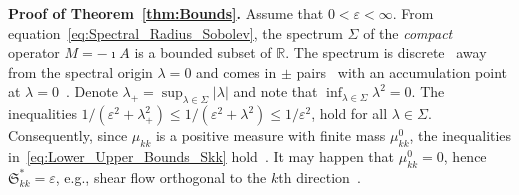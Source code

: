 \documentclass[english,12pt,jmp,graphicx]{revtex4-1}
\newcommand{\thmref}[1]{Theorem~\ref{#1}}
\newcommand{\Sg}{\mathfrak{S}}
\newcommand{\Ag}{\mathfrak{A}}
\begin{document}
\noindent
\textbf{Proof of \thmref{thm:Bounds}.}
%
Assume that $0<\varepsilon<\infty$. From
equation~\eqref{eq:Spectral_Radius_Sobolev}, the spectrum 
$\Sigma$ of the
\emph{compact}~\cite{Bhattacharya:AAP:1999:951,Bhattacharya:1989:ASD,Majda:Kramer:1999:book}
operator $M=-\imath A$ is a bounded subset of $\mathbb{R}$. The
spectrum is discrete~\cite{Stakgold:BVP:2000} away from the spectral origin
$\lambda=0$ and comes in $\pm$ 
pairs~\cite{Pavliotis:PHD_Thesis} with an accumulation
point at $\lambda=0$~\cite{Stakgold:BVP:2000}. Denote
$\lambda_+=\sup_{\lambda\in\Sigma}|\lambda|$ and note that
$\inf_{\lambda\in\Sigma}\lambda^2=0$. The inequalities 
$1/(\varepsilon^2+\lambda_+^2)\leq1/(\varepsilon^2+\lambda^2)\leq1/\varepsilon^2$,
hold for all
$\lambda\in\Sigma$. Consequently, since
$\mu_{kk}$ is a positive measure with finite mass $\mu_{kk}^0$, 
the inequalities in~\eqref{eq:Lower_Upper_Bounds_Skk}
hold~\cite{Folland:99:RealAnalysis}. It may happen that
$\mu_{kk}^0=0$, hence $\Sg^*_{kk}=\varepsilon$, e.g., shear flow
orthogonal to the $k$th
direction~\cite{Avellaneda:CMP-339,Fannjiang:1994:SIAM_JAM:333}.        
\end{document}
